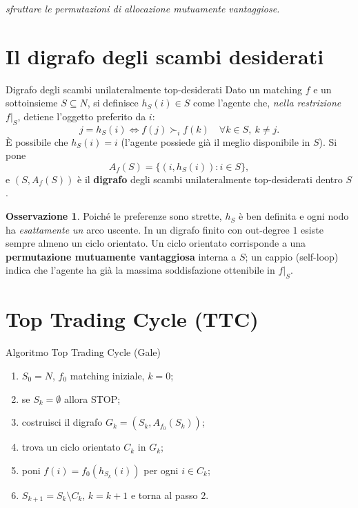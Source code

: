 \documentclass[12pt,a4paper,twoside]{book}
\theoremstyle{plain}
\theoremstyle{definition}
\newtheorem{remark}[theorem]{Osservazione}
\begin{document}
\begin{center}\itshape
sfruttare le permutazioni di allocazione mutuamente vantaggiose.
\end{center}

\section{Il digrafo degli scambi desiderati}

\begin{defbox}{Digrafo degli scambi unilateralmente top-desiderati}
Dato un matching $f$ e un sottoinsieme $S\subseteq N$, si definisce $h_S(i)\in S$ come l'agente che, \emph{nella restrizione $f|_S$}, detiene l'oggetto preferito da $i$:
\[ j=h_S(i)\iff f(j)\succ_i f(k)\quad\forall k\in S,\ k\ne j. \]
È possibile che $h_S(i)=i$ (l'agente possiede già il meglio disponibile in $S$). Si pone
\[ A_f(S)=\bigl\{(i,h_S(i)) : i\in S\bigr\}, \]
e $(S,A_f(S))$ è il \textbf{digrafo} degli scambi unilateralmente top-desiderati dentro $S$.
\end{defbox}

\begin{remark}
Poiché le preferenze sono strette, $h_S$ è ben definita e ogni nodo ha \emph{esattamente un} arco uscente. In un digrafo finito con out-degree $1$ esiste sempre almeno un ciclo orientato. Un ciclo orientato corrisponde a una \textbf{permutazione mutuamente vantaggiosa} interna a $S$; un cappio (self-loop) indica che l'agente ha già la massima soddisfazione ottenibile in $f|_S$.
\end{remark}

\section{Top Trading Cycle (TTC)}

\begin{defbox}{Algoritmo Top Trading Cycle (Gale)}
\begin{enumerate}
  \item $S_0=N$, $f_0$ matching iniziale, $k=0$;
  \item se $S_k=\emptyset$ allora STOP;
  \item costruisci il digrafo $G_k=(S_k,A_{f_0}(S_k))$;
  \item trova un ciclo orientato $C_k$ in $G_k$;
  \item poni $f(i)=f_0(h_{S_k}(i))$ per ogni $i\in C_k$;
  \item $S_{k+1}=S_k\setminus C_k$, $k=k+1$ e torna al passo 2.
\end{enumerate}
\end{defbox}
\end{document}
